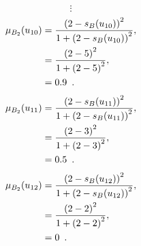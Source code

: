 \documentclass[a4paper,openany]{book}
\begin{document}
				\[
					\vdots
				\]
				\begin{align}
					\mu_{B_2}(u_{10}) &= \frac{\left(2-s_B(u_{10})\right)^2}{1 + \left(2-s_B(u_{10})\right)^2} ,\\
					&= \frac{\left(2-5\right)^2}{1 + \left(2-5\right)^2} \notag ,\\
					&= 0.9 \enspace. \notag
				\end{align}
				\begin{align}
					\mu_{B_2}(u_{11}) &= \frac{\left(2-s_B(u_{11})\right)^2}{1 + \left(2-s_B(u_{11})\right)^2} ,\\
					&= \frac{\left(2-3\right)^2}{1 + \left(2-3\right)^2} \notag ,\\
					&= 0.5 \enspace. \notag
				\end{align}
				\begin{align}
					\mu_{B_2}(u_{12}) &= \frac{\left(2-s_B(u_{12})\right)^2}{1 + \left(2-s_B(u_{12})\right)^2} ,\\
					&= \frac{\left(2-2\right)^2}{1 + \left(2-2\right)^2} \notag ,\\
					&= 0 \enspace. \notag
				\end{align}
\end{document}
